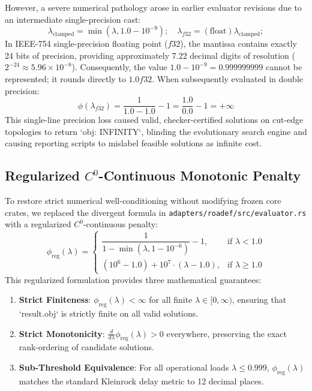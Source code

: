 \documentclass[10pt,journal,compsoc]{IEEEtran}
\begin{document}
However, a severe numerical pathology arose in earlier evaluator revisions due to an intermediate single-precision cast:
\begin{equation}
\lambda_{\text{clamped}} = \min(\lambda, 1.0 - 10^{-9}); \quad \lambda_{f32} = (\text{float})\lambda_{\text{clamped}};
\end{equation}
In IEEE-754 single-precision floating point ($f32$), the mantissa contains exactly 24 bits of precision, providing approximately $7.22$ decimal digits of resolution ($2^{-24} \approx 5.96 \times 10^{-8}$). Consequently, the value $1.0 - 10^{-9} = 0.999999999$ cannot be represented; it rounds directly to $1.0f32$. When subsequently evaluated in double precision:
\begin{equation}
\phi(\lambda_{f32}) = \frac{1}{1.0 - 1.0} - 1 = \frac{1.0}{0.0} - 1 = +\infty
\end{equation}
This single-line precision loss caused valid, checker-certified solutions on cut-edge topologies to return `obj: INFINITY`, blinding the evolutionary search engine and causing reporting scripts to mislabel feasible solutions as infinite cost.

\subsection{Regularized $C^0$-Continuous Monotonic Penalty}
To restore strict numerical well-conditioning without modifying frozen core crates, we replaced the divergent formula in \texttt{adapters/roadef/src/evaluator.rs} with a regularized $C^0$-continuous penalty:
\begin{equation}
\phi_{\text{reg}}(\lambda) = 
\begin{cases}
\dfrac{1}{1 - \min(\lambda, 1 - 10^{-6})} - 1, & \text{if } \lambda < 1.0 \\[10pt]
(10^6 - 1.0) + 10^7 \cdot (\lambda - 1.0), & \text{if } \lambda \ge 1.0
\end{cases}
\end{equation}
This regularized formulation provides three mathematical guarantees:
\begin{enumerate}
    \item \textbf{Strict Finiteness}: $\phi_{\text{reg}}(\lambda) < \infty$ for all finite $\lambda \in [0, \infty)$, ensuring that `result.obj` is strictly finite on all valid solutions.
    \item \textbf{Strict Monotonicity}: $\frac{d}{d\lambda} \phi_{\text{reg}}(\lambda) > 0$ everywhere, preserving the exact rank-ordering of candidate solutions.
    \item \textbf{Sub-Threshold Equivalence}: For all operational loads $\lambda \le 0.999$, $\phi_{\text{reg}}(\lambda)$ matches the standard Kleinrock delay metric to 12 decimal places.
\end{enumerate}
\end{document}
